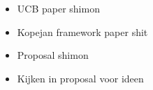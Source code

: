 \begin{itemize}
  \item{UCB paper shimon}
  \item{Kopejan framework paper shit}
  \item{Proposal shimon}
  \item{Kijken in proposal voor ideen}
\end{itemize}
